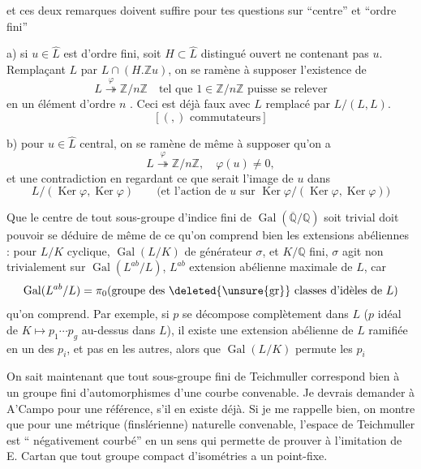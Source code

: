 et ces deux remarques doivent suffire pour tes questions sur ``centre'' et ``ordre fini''

a) si $u\in\hat L$ est d'ordre fini, soit $H\subset\hat L$ distingué ouvert ne contenant pas $u$\unsure{$\overset{\circ}{!}$}.
Remplaçant $L$ par $L\cap(H.\mathbb Zu)$, on se ramène à supposer  l'existence de
\[
L\overset{\varphi}{\twoheadrightarrow}\mathbb Z/n\mathbb Z
\quad\text{tel que }1\in\mathbb Z/n\mathbb Z\text{ puisse se relever}
\]
en un élément d'ordre $n$ . Ceci est déjà faux avec $L$ remplacé par $L/(L,L)$.
\[
[(,)\text{ commutateurs}]
\]

b) pour $u\in\hat L$ central, on se ramène de même à supposer qu'on a
\[
L\overset{\varphi}{\twoheadrightarrow}\mathbb Z/n\mathbb Z,\quad
\varphi(u)\ne0,
\]
et une contradiction en regardant ce que serait l'image de  $u$ dans
\[
L/(\operatorname{Ker}\varphi,\operatorname{Ker}\varphi)
\qquad
\text{(et l'action de }u\text{ sur }
\operatorname{Ker}\varphi/(\operatorname{Ker}\varphi,\operatorname{Ker}\varphi))
\]


Que le centre de tout sous-groupe d'indice fini de $\operatorname{Gal}(\overline{\mathbb Q}/\mathbb Q)$ soit trivial doit pouvoir se déduire de même de ce qu'on comprend bien les extensions abéliennes : pour $L/K$ cyclique, $\operatorname{Gal}(L/K)$ de générateur $\sigma$, et $K/\mathbb Q$ fini, $\sigma$ agit non trivialement sur $\operatorname{Gal}(L^{ab}/L)$, $L^{ab}$ extension abélienne maximale de $L$, car
\[
\operatorname{Gal}(L^{ab}/L)=
\pi_0(\text{groupe des \deleted{\unsure{gr}} classes d'idèles de }L)
\]
qu'on comprend. Par exemple, si $p$ se décompose complètement dans $L$ ($p$ idéal de $K\longmapsto p_1\cdots p_g$ au-dessus dans $L$), il existe une extension abélienne de $L$ ramifiée en un des $p_i$, et pas en les autres, alors que $\operatorname{Gal}(L/K)$ permute les $p_i$

On sait maintenant que tout sous-groupe fini de Teichmuller correspond bien à un groupe fini d'automorphismes d'une courbe convenable. Je devrais demander à A'Campo pour une référence, s'il en existe déjà. Si je me rappelle bien, on montre que pour une métrique (finslérienne)  naturelle convenable, l'espace de Teichmuller est `` négativement courbé'' en un sens qui permette de prouver à l'imitation de E. Cartan que tout groupe compact d'isométries a un point-fixe.

